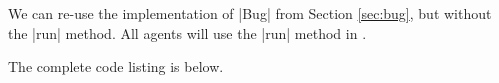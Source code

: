 We can re-use the implementation of |Bug| from Section \ref{sec:bug},
but without the |run| method.
All agents will use the |run| method in .

The complete code listing is below.

